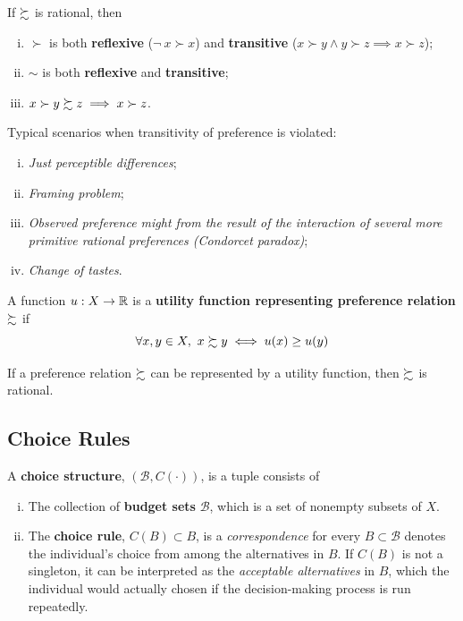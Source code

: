 \documentclass{article}
\begin{document}
		\begin{proposition}[1.B.1]
			If $\succsim$ is rational, then
			\begin{enumerate}[(i)]
				\item $\succ$ is both \textbf{reflexive} ($\neg\ x \succ x$) and \textbf{transitive} ($x \succ y \land y \succ z \implies x \succ z$);
				\item $\sim$ is both \textbf{reflexive} and \textbf{transitive};
				\item $x \succ y \succsim z \implies x \succ z$.
			\end{enumerate}
		\end{proposition}
		
		\begin{example}
			Typical scenarios when transitivity of preference is violated:
			\begin{enumerate}[(i)]
				\item \emph{Just perceptible differences};
				\item \emph{Framing problem};
				\item \emph{Observed preference might from the result of the interaction of several more primitive rational preferences (Condorcet paradox)};
				\item \emph{Change of tastes}.
			\end{enumerate}
		\end{example}
		
		\begin{definition}[1.B.2]
			A function $u: X \to \mathbb{R}$ is a \textbf{utility function representing preference relation} $\succsim$ if
			\begin{equation}
				\forall x, y \in X,\ x \succsim y \iff u(x) \geq u(y)
			\end{equation}
		\end{definition}
		
		\begin{proposition}[1.B.2]
			If a preference relation $\succsim$ can be represented by a utility function, then $\succsim$ is rational.
		\end{proposition}
	
	\subsection{Choice Rules}
		\begin{definition}
			A \textbf{choice structure}, $(\mathscr{B}, C(\cdot))$, is a tuple consists of
			\begin{enumerate}[(i)]
				\item The collection of \textbf{budget sets} $\mathscr{B}$, which is a set of nonempty subsets of $X$.
				\item The \textbf{choice rule}, $C(B) \subset B$, is a \emph{correspondence} for every $B \subset \mathscr{B}$ denotes the individual's choice from among the alternatives in $B$. If $C(B)$ is not a singleton, it can be interpreted as the \emph{acceptable alternatives} in $B$, which the individual would actually chosen if the decision-making process is run repeatedly. 
			\end{enumerate}
		\end{definition}
		
\end{document}

